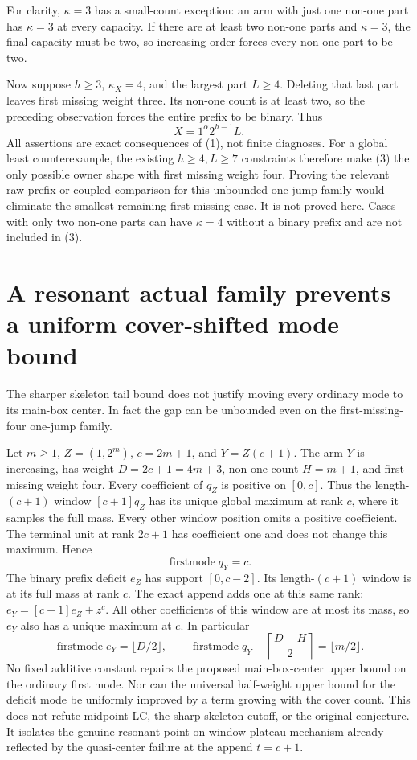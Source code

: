 For clarity, $\kappa=3$ has a small-count exception: an arm with
just one non-one part has $\kappa=3$ at every capacity.
If there are at least two non-one parts and $\kappa=3$,
the final capacity must be two, so increasing order forces every
non-one part to be two.

Now suppose $h\ge3$, $\kappa_X=4$, and the largest part $L\ge4$.
Deleting that last part leaves first missing weight three.
Its non-one count is at least two, so the preceding observation
forces the entire prefix to be binary. Thus
\[
                         X=1^\alpha2^{h-1}L.              \tag{3}
\]
All assertions are exact consequences of (1), not finite diagnoses.
For a global least counterexample, the existing $h\ge4,L\ge7$
constraints therefore make (3) the only possible owner shape
with first missing weight four. Proving the relevant raw-prefix
or coupled comparison for this unbounded one-jump family would
eliminate the smallest remaining first-missing case. It is not
proved here. Cases with only two non-one parts can have
$\kappa=4$ without a binary prefix and are not included in (3).

\section{A resonant actual family prevents a uniform cover-shifted mode bound}
The sharper skeleton tail bound does not justify moving every
ordinary mode to its main-box center. In fact the gap can be
unbounded even on the first-missing-four one-jump family.

Let $m\ge1$, $Z=(1,2^m)$, $c=2m+1$, and $Y=Z(c+1)$.
The arm $Y$ is increasing, has weight $D=2c+1=4m+3$,
non-one count $H=m+1$, and first missing weight four.
Every coefficient of $q_Z$ is positive on $[0,c]$.
Thus the length-$(c+1)$ window $[c+1]q_Z$ has its unique
global maximum at rank $c$, where it samples the full mass.
Every other window position omits a positive coefficient.
The terminal unit at rank $2c+1$ has coefficient one and
does not change this maximum. Hence
\[
                      \operatorname{firstmode}q_Y=c.
\]
The binary prefix deficit $e_Z$ has support $[0,c-2]$.
Its length-$(c+1)$ window is at its full mass at rank $c$.
The exact append adds one at this same rank:
$e_Y=[c+1]e_Z+z^c$.
All other coefficients of this window are at most its mass,
so $e_Y$ also has a unique maximum at $c$.
In particular
\[
 \operatorname{firstmode}e_Y=\lfloor D/2\rfloor,
 \qquad
 \operatorname{firstmode}q_Y-
          \left\lceil\frac{D-H}{2}\right\rceil
                              =\lfloor m/2\rfloor.         \tag{4}
\]
No fixed additive constant repairs the proposed main-box-center
upper bound on the ordinary first mode. Nor can the universal
half-weight upper bound for the deficit mode be uniformly improved
by a term growing with the cover count.
This does not refute midpoint LC, the sharp skeleton cutoff,
or the original conjecture. It isolates the genuine resonant
point-on-window-plateau mechanism already reflected by the
quasi-center failure at the append $t=c+1$.
